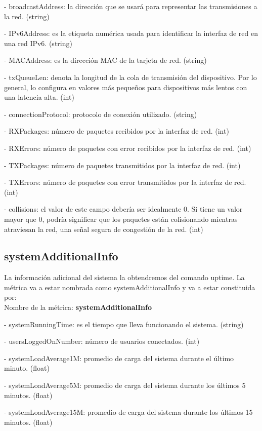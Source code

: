 \documentclass[ spanish, a4paper, 12pt, oneside]{report}
\begin{document}
\hyp{} broadcastAddress: la dirección que se usará para representar las transmisiones a la red. (string)

\hyp{} IPv6Address: es la etiqueta numérica usada para identificar la interfaz de red en una red IPv6. (string)

\hyp{} MACAddress: es la dirección MAC de la tarjeta de red. (string)

\hyp{} txQueueLen: denota la longitud de la cola de transmisión del dispositivo. Por lo general, lo configura en valores más pequeños 
para dispositivos más lentos con una latencia alta. (int)

\hyp{} connectionProtocol: protocolo de conexión utilizado. (string)

\hyp{} RXPackages: número de paquetes recibidos por la interfaz de red. (int)

\hyp{} RXErrors: número de paquetes con error recibidos por la interfaz de red. (int)

\hyp{} TXPackages: número de paquetes transmitidos por la interfaz de red. (int)

\hyp{} TXErrors: número de paquetes con error transmitidos por la interfaz de red. (int)

\hyp{} collisions: el valor de este campo debería ser idealmente 0. Si tiene un valor mayor que 0, podría significar que los paquetes
están colisionando mientras atraviesan la red, una señal segura de congestión de la red. (int)

\subsection{systemAdditionalInfo}
La información adicional del sistema la obtendremos del comando uptime.
La métrica va a estar nombrada como systemAdditionalInfo y va a estar constituida por:\\
  
Nombre de la métrica: \textbf{systemAdditionalInfo}

\hyp{} systemRunningTime: es el tiempo que lleva funcionando el sistema. (string)

\hyp{} usersLoggedOnNumber: número de usuarios conectados. (int)

\hyp{} systemLoadAverage1M: promedio de carga del sistema durante el último minuto. (float)

\hyp{} systemLoadAverage5M: promedio de carga del sistema durante los últimos 5 minutos. (float)

\hyp{} systemLoadAverage15M: promedio de carga del sistema durante los últimos 15 minutos. (float)
\end{document}

